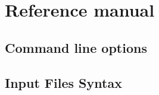 \documentclass[a4paper,12pt]{report}
\newcommand{\caml}{\textsf{Caml}}
\newcommand{\why}{\textsf{Why}}
\begin{document}







\chapter{Reference manual}
\label{refman}

\section{Command line options}
\label{usage}


\section{Input Files Syntax}
\label{syntax}
\end{document}
